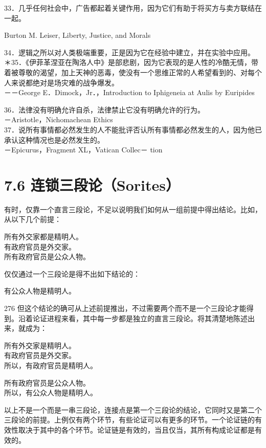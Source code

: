 33．几乎任何社会中，广告都起着关键作用，因为它们有助于将买方与卖方联结在一起。

\begin{displayquote}
Burton M. Leiser, Liberty, Justice, and Morals
\end{displayquote}

34．逻辑之所以对人类极端重要，正是因为它在经验中建立，并在实验中应用。\\
＊35．《伊菲革涅亚在陶洛人中》是部悲剧，因为它表现的是人性的冷酷无情，带着被尊敬的渴望，加上天神的恶毒，使没有一个思维正常的人希望看到的、对每个人来说都绝对是场灾难的战争爆发。\\
－－George E．Dimock，Jr．，Introduction to Iphigeneia at Aulis by Euripides

36．法律没有明确允许自杀，法律禁止它没有明确允许的行为。\\
－Aristotle，Nichomachean Ethics\\
37．说所有事情都必然发生的人不能批评否认所有事情都必然发生的人，因为他已承认这种情况也是必然发生的。\\
－Epicurus，Fragment XL，Vatican Collec－ tion

\section*{7.6 连锁三段论（Sorites）}
有时，仅靠一个直言三段论，不足以说明我们如何从一组前提中得出结论。比如，从以下几个前提：

所有外交家都是精明人。\\
有政府官员是外交家。\\
所有政府官员是公众人物。

仅仅通过一个三段论是得不出如下结论的：

有公众人物是精明人。

276 但这个结论的确可从上述前提推出，不过需要两个而不是一个三段论才能得到。沿着论证进程来看，其中每一步都是独立的直言三段论。将其清楚地陈述出来，就成为：

所有外交家是精明人。\\
有政府官员是外交家。\\
所以，有政府官员是精明人。

所有政府官员是公众人物。\\
所以，有公众人物是精明人。

以上不是一个而是一串三段论，连接点是第一个三段论的结论，它同时又是第二个三段论的前提。上例仅有两个环节，有些论证可以有更多的环节。一个论证链的有效性取决于其中的各个环节。论证链是有效的，当且仅当，其所有构成论证都是有效的。


